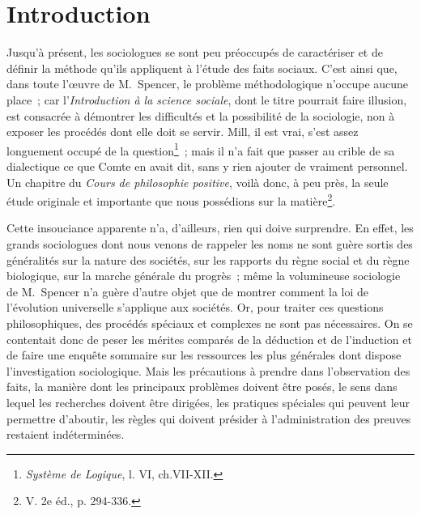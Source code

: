 \documentclass[french,twoside]{book} %
\begin{document}
\section[{Introduction}]{Introduction}\renewcommand{\leftmark}{Introduction}

\noindent Jusqu’à présent, les sociologues se sont peu préoccupés de caractériser et de définir la méthode qu’ils appliquent à l’étude des faits sociaux. C’est ainsi que, dans toute l’œuvre de M. Spencer, le problème méthodologique n’occupe aucune place ; car l’\emph{Introduction à la science sociale}, dont le titre pourrait faire illusion, est consacrée à démontrer les difficultés et la possibilité de la sociologie, non à exposer les procédés dont elle doit se servir. Mill, il est vrai, s’est assez longuement occupé de la question\footnote{\emph{Système de Logique}, l. VI, ch.VII-XII.} ; mais il n’a fait que passer au crible de sa dialectique ce que Comte en avait dit, sans y rien ajouter de vraiment personnel. Un chapitre du \emph{Cours de philosophie positive}, voilà donc, à peu près, la seule étude originale et importante que nous possédions sur la matière\footnote{ V. 2e éd., p. 294-336.}.\par
Cette insouciance apparente n’a, d’ailleurs, rien qui doive surprendre. En effet, les grands sociologues dont nous venons de rappeler les noms ne sont guère sortis des généralités sur la nature des sociétés, sur les rapports du règne social et du règne biologique, sur la marche générale du progrès ; même la volumineuse sociologie de M. Spencer n’a guère d’autre objet que de montrer comment la loi de l’évolution universelle s’applique aux sociétés. Or, pour traiter ces questions philosophiques, des procédés spéciaux et complexes ne sont pas nécessaires. On se contentait donc de peser les mérites comparés de la déduction et de l’induction et de faire une enquête sommaire sur les ressources les plus générales dont dispose l’investigation sociologique. Mais les précautions à prendre dans l’observation des faits, la manière dont les principaux problèmes doivent être posés, le sens dans lequel les recherches doivent être dirigées, les pratiques spéciales qui peuvent leur permettre d’aboutir, les règles qui doivent présider à l’administration des preuves restaient indéterminées.\par
\end{document}
